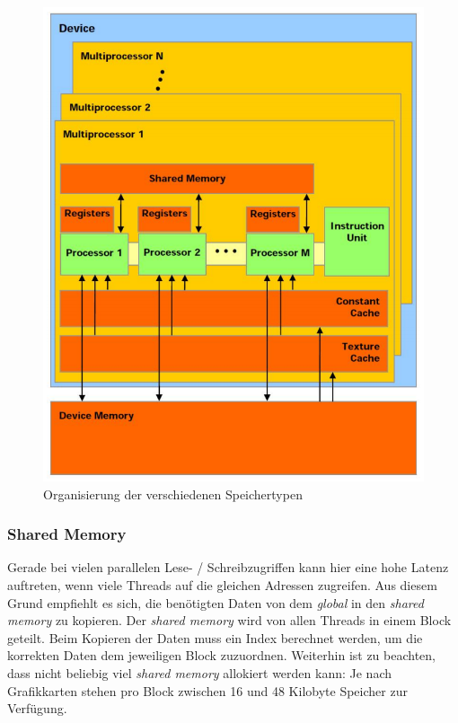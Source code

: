 \begin{figure}
	\centering
	\includegraphics[scale=0.4]{images/cuda_mem.png}
	\caption{Organisierung der verschiedenen Speichertypen}
	\label{img:cuda_mem}
\end{figure}

\subsubsection{Shared Memory}

Gerade bei vielen parallelen Lese- / Schreibzugriffen kann hier eine hohe Latenz auftreten, wenn viele Threads auf die gleichen Adressen zugreifen. Aus diesem Grund empfiehlt es sich, die benötigten Daten von dem \textit{global} in den \textit{shared memory} zu kopieren. Der \textit{shared memory} wird von allen Threads in einem Block geteilt. Beim Kopieren der Daten muss ein Index berechnet werden, um die korrekten Daten dem jeweiligen Block zuzuordnen. Weiterhin ist zu beachten, dass nicht beliebig viel \textit{shared memory} allokiert werden kann: Je nach Grafikkarten stehen pro Block zwischen 16 und 48 Kilobyte Speicher zur Verfügung. 


